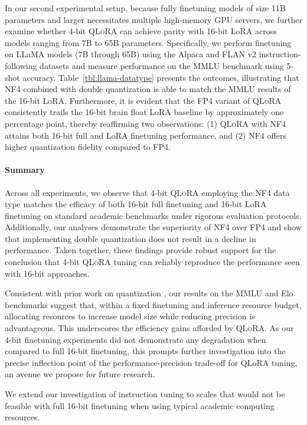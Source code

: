 In our second experimental setup, because fully finetuning models of size 11B parameters and larger necessitates multiple high-memory GPU servers, we further examine whether 4-bit \textsc{QLoRA} can achieve parity with 16-bit LoRA across models ranging from 7B to 65B parameters. Specifically, we perform finetuning on LLaMA models (7B through 65B) using the Alpaca and FLAN v2 instruction-following datasets and measure performance on the MMLU benchmark using 5-shot accuracy. Table~\ref{tbl:llama-datatype} presents the outcomes, illustrating that NF4 combined with double quantization is able to match the MMLU results of the 16-bit LoRA. Furthermore, it is evident that the FP4 variant of \textsc{QLoRA} consistently trails the 16-bit brain float LoRA baseline by approximately one percentage point, thereby reaffirming two observations: (1) \textsc{QLoRA} with NF4 attains both 16-bit full and LoRA finetuning performance, and (2) NF4 offers higher quantization fidelity compared to FP4.

\paragraph{Summary} Across all experiments, we observe that 4-bit \textsc{QLoRA} employing the NF4 data type matches the efficacy of both 16-bit full finetuning and 16-bit LoRA finetuning on standard academic benchmarks under rigorous evaluation protocols. Additionally, our analyses demonstrate the superiority of NF4 over FP4 and show that implementing double quantization does not result in a decline in performance. Taken together, these findings provide robust support for the conclusion that 4-bit \textsc{QLoRA} tuning can reliably reproduce the performance seen with 16-bit approaches.

Consistent with prior work on quantization \citep{dettmers2022case}, our results on the MMLU and Elo benchmarks suggest that, within a fixed finetuning and inference resource budget, allocating resources to increase model size while reducing precision is advantageous. This underscores the efficiency gains afforded by \textsc{QLoRA}. As our 4-bit finetuning experiments did not demonstrate any degradation when compared to full 16-bit finetuning, this prompts further investigation into the precise inflection point of the performance-precision trade-off for QLoRA tuning, an avenue we propose for future research.

We extend our investigation of instruction tuning to scales that would not be feasible with full 16-bit finetuning when using typical academic computing resources.

